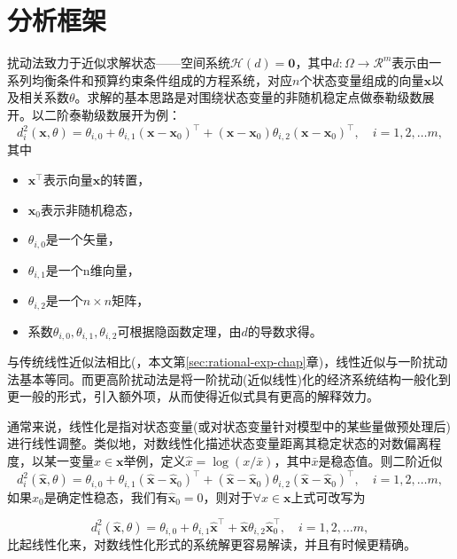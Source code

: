 \section{分析框架}
\label{sec:pta-perturbation-framework}
扰动法致力于近似求解状态——空间系统$\mathcal{H}(d) = \bm{0}$，其中$d:\Omega \rightarrow \mathcal{R}^{m}$表示由一系列均衡条件和预算约束条件组成的方程系统，对应$n$个状态变量组成的向量$\bm{x}$以及相关系数$\theta$。求解的基本思路是对围绕状态变量的非随机稳定点做泰勒级数展开。以二阶泰勒级数展开为例：
\begin{equation}
  \label{eq:ptb-tse-2nd-example}
  d_i^2(\bm{x},\theta) = \theta_{i,0} + \theta_{i,1} (\bm{x}-\bm{x}_0)^{\top} +  (\bm{x}-\bm{x}_0) \theta_{i,2} (\bm{x}-\bm{x}_0)^{\top}, \quad i=1,2,\ldots m,
\end{equation}
其中
\begin{itemize}
  \item $\bm{x}^{\top}$表示向量$\bm{x}$的转置，
  \item $\bm{x}_0$表示非随机稳态，
  \item $\theta_{i,0}$是一个矢量，
  \item $\theta_{i,1}$是一个n维向量，
  \item $\theta_{i,2}$是一个$n \times n$矩阵，
  \item 系数$\theta_{i,0}, \theta_{i,1}, \theta_{i,2}$可根据隐函数定理，由$d$的导数求得。
\end{itemize}

与传统线性近似法相比(\citep{King:1988bk,King:1988kf,King:2002ih}，本文第\ref{sec:rational-exp-chap}章)，线性近似与一阶扰动法基本等同。而更高阶扰动法是将一阶扰动(近似线性)化的经济系统结构一般化到更一般的形式，引入额外项，从而使得近似式具有更高的解释效力。
\begin{remark}[扰动法的线性化和对数线性化]
  通常来说，线性化是指对状态变量(或对状态变量针对模型中的某些量做预处理后)进行线性调整。类似地，对数线性化描述状态变量距离其稳定状态的对数偏离程度，以某一变量$x \in \bm{x}$举例，定义$\hat{x} = \log \left(x / \bar{x} \right)$，其中$\bar{x}$是稳态值。则二阶近似
  \begin{equation*}
    d_i^2(\hat{\bm{x}},\theta) = \theta_{i,0} + \theta_{i,1} (\hat{\bm{x}} - \hat{\bm{x}}_0)^{\top} +  (\hat{\bm{x}} - \hat{\bm{x}}_0) \theta_{i,2} (\hat{\bm{x}} - \hat{\bm{x}}_0)^{\top}, \quad i=1,2,\ldots m,
  \end{equation*}
  如果$x_0$是确定性稳态，我们有$\hat{\bm{x}}_0 = 0$，则对于$\forall x \in \bm{x}$上式可改写为

  \begin{equation*}
      d_i^2(\hat{\bm{x}},\theta) = \theta_{i,0} + \theta_{i,1} \hat{\bm{x}}^{\top} +  \hat{\bm{x}} \theta_{i,2} \hat{\bm{x}}_0^{\top}, \quad i=1,2,\ldots m,
  \end{equation*}
  比起线性化来，对数线性化形式的系统解更容易解读，并且有时候更精确。
\end{remark}

